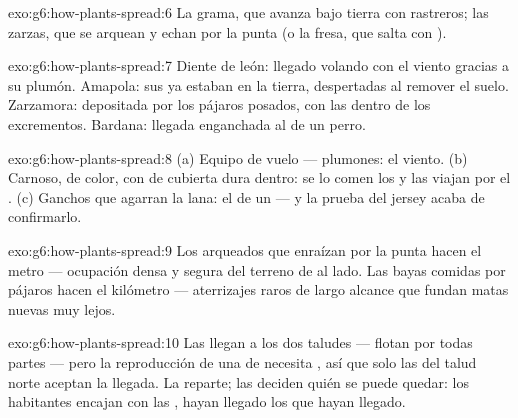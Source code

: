 \begin{solution}{exo:g6:how-plants-spread:6}
La grama, que avanza bajo tierra con  rastreros; las zarzas, que
se arquean y echan  por la punta (o la fresa, que salta con
).
\end{solution}

\begin{solution}{exo:g6:how-plants-spread:7}
Diente de león: llegado volando con el viento gracias a su plumón.
Amapola: sus  ya estaban en la tierra, despertadas al remover
el suelo. Zarzamora: depositada por los pájaros posados, con las
 dentro de los excrementos. Bardana: llegada enganchada al 
de un perro.
\end{solution}

\begin{solution}{exo:g6:how-plants-spread:8}
(a) Equipo de vuelo --- plumones: el viento. (b) Carnoso, de color, con
 de cubierta dura dentro: se lo comen los  y las
 viajan por el . (c) Ganchos que agarran la lana:
el  de un  --- y la prueba del jersey acaba de confirmarlo.
\end{solution}

\begin{solution}{exo:g6:how-plants-spread:9}
Los  arqueados que enraízan por la punta hacen el metro ---
ocupación densa y segura del terreno de al lado. Las bayas comidas por
pájaros hacen el kilómetro --- aterrizajes raros de largo alcance que
fundan matas nuevas muy lejos.
\end{solution}

\begin{solution}{exo:g6:how-plants-spread:10}
Las  llegan a los dos taludes --- flotan por todas partes ---
pero la reproducción de una  de  necesita , así que
solo las  del talud norte aceptan la llegada. La 
reparte; las  deciden quién se puede quedar: los habitantes
encajan con las , hayan llegado los que hayan llegado.
\end{solution}

